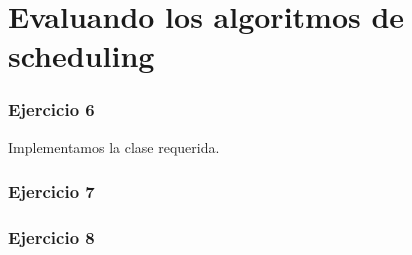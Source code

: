 \part{Evaluando los algoritmos de scheduling}

\section{Ejercicio 6}

Implementamos la clase requerida.

\section{Ejercicio 7}

\section{Ejercicio 8}